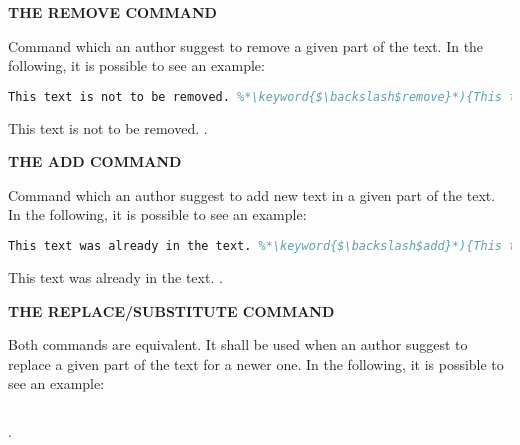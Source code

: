 \textbf{\uppercase {The remove command}}

Command which an author suggest to remove a given part of the text. In the following, it is possible to see an example:

\begin{center}
\begin{minipage}[ht]{0.45\textwidth}
\begin{lstlisting}[language=tex]
This text is not to be removed. %*\keyword{$\backslash$remove}*){This text is to be removed}.
\end{lstlisting}
\end{minipage}
\hspace{10pt}
\begin{minipage}[ht]{0.45\textwidth}
This text is not to be removed. .
\end{minipage}
\end{center}

\textbf{\uppercase {The add command}}

Command which an author suggest to add new text in a given part of the text. In the following, it is possible to see an example:

\begin{center}
\begin{minipage}[ht]{0.45\textwidth}
\begin{lstlisting}[language=tex]
This text was already in the text. %*\keyword{$\backslash$add}*){This text is been added now}.
\end{lstlisting}
\end{minipage}
\hspace{10pt}
\begin{minipage}[ht]{0.45\textwidth}
This text was already in the text. .
\end{minipage}
\end{center}

\textbf{\uppercase {The replace/substitute command}}

Both commands are equivalent. It shall be used when an author suggest to replace a given part of the text for a newer one. In the following, it is possible to see an example:

\begin{center}
\begin{minipage}[ht]{0.45\textwidth}
\begin{lstlisting}[language=tex]
%*\keyword{$\backslash$replace}*){This part of the text needs to be replaced}{for this newer part of the text}.
\end{lstlisting}
\end{minipage}
\hspace{10pt}
\begin{minipage}[ht]{0.45\textwidth}
.
\end{minipage}
\end{center}

